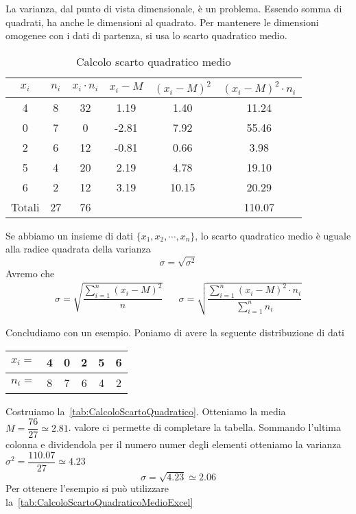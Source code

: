 La varianza,  dal punto di vista dimensionale, è un problema.  Essendo somma di quadrati, ha anche le dimensioni al quadrato. Per mantenere le dimensioni omogenee con i dati  di partenza, si usa lo scarto quadratico medio. 
\begin{table}
	\centering
	\begin{tabular}{S[table-format=1.0]S[table-format=2.0]S[table-format=2.0]S[table-format=1.2]S[table-format=1.4]S[table-format=2.4] }
		\toprule
		{$x_i$}	&{$n_i$}  & {$x_i\cdot n_i$} & {$x_i-M$} & {$(x_i-M )^2$} & {$(x_i-M)^2\cdot n_i $ } \\
			& 8 & 32  & 1.19 &1.40  & 11.24 \\ 
		0	& 7 & 0 & -2.81 &7.92  & 55.46 \\ 
		2	& 6 & 12 & -0.81 &0.66  & 3.98 \\ 
		5	& 4 & 20& 2.19&4.78   & 19.10 \\ 
		6	& 2 & 12 & 3.19 &10.15  &20.29 \\
		\midrule 
		{Totali}& 27& 76 &  &  & 110.07 \\
		\bottomrule 
	\end{tabular} 
	\caption{Calcolo scarto quadratico medio}
	\label{tab:CalcoloScartoQuadratico}
\end{table}
\begin{defn}
	Se abbiamo un insieme di dati $\lbrace x_{1},x_{2},\cdots,x_{n}\rbrace$, lo scarto quadratico medio è  uguale alla radice quadrata della varianza \[\sigma=\sqrt{\sigma^2} \]
	Avremo che 
	\begin{align*}
		\sigma=\sqrt{\dfrac{\sum_{i=1}^{n}(x_{i}-M)^2}{n}}&&\sigma=\sqrt{\dfrac{\sum_{i=1}^{n}(x_{i}-M)^{2}\cdot n_{i}}{\sum_{i=1}^{n} n_{i}}}
	\end{align*}
\end{defn}
Concludiamo con un esempio. Poniamo di avere la seguente distribuzione di dati
\begin{center}
	\begin{tabular}{l*{5} {S[table-format=1.0]}}
		{$x_{i}=$}	&4  &0  &2  &5  &6\\
		\midrule 
		{$n_{i}=$}	&8 &7  &6 &4 &2\\   
	\end{tabular}
\end{center}
Costruiamo la~\vref{tab:CalcoloScartoQuadratico}. Otteniamo la media  $M=\dfrac{76}{27}\simeq\num{2.81}$.  valore ci permette di completare la tabella. Sommando l'ultima colonna e dividendola per il  numero numer degli elementi otteniamo la varianza $\sigma^2=\dfrac{110.07}{27}\simeq\num{4.23}$
\[\sigma=\sqrt{4.23}\simeq\num{2.06}\]
Per ottenere l'esempio si può utilizzare la~\vref{tab:CalcoloScartoQuadraticoMedioExcel}

